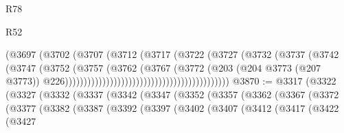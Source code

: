 \begin{lexlean}{R78}
\begin{lexlean}{R52}
\begin{coremodule}
{{{{{{{{{{{{{{{{{{{{{{{{{{{{{{{{{{{{{{{{{{{{{{{{{{{{{{{{{{{{{{{{{{{{{{{{{{{{{{{{{{{{{{{{{{{{{{{{{{{{{{{{{{{{{{{{{{{{{{{{{{{{{{{{{{{{{{{{{{{{{{{{{{{{{{{{{{{{{{{{{{{{{{{{{{{{{{{{{{{{{{{{{{{{{{{{{{{{{{                                                          (@3697
                                                            (@3702
                                                              (@3707
                                                                (@3712
                                                                  (@3717
                                                                    (@3722
                                                                      (@3727
                                                                        (@3732
                                                                          (@3737
                                                                            (@3742
                                                                              (@3747
                                                                                (@3752
                                                                                  (@3757
                                                                                    (@3762
                                                                                      (@3767
                                                                                        (@3772
                                                                                          (@203
                                                                                            (@204
                                                                                              @3773
                                                                                              (@207
                                                                                                @3773))
                                                                                            @226))))))))))))))))))))))))))))))))))))))))))))
@3870 := @3317
    (@3322
      (@3327
        (@3332
          (@3337
            (@3342
              (@3347
                (@3352
                  (@3357
                    (@3362
                      (@3367
                        (@3372
                          (@3377
                            (@3382
                              (@3387
                                (@3392
                                  (@3397
                                    (@3402
                                      (@3407
                                        (@3412
                                          (@3417
                                            (@3422
                                              (@3427
}}}}}}}}}}}}}}}}}}}}}}}}}}}}}}}}}}}}}}}}}}}}}}}}}}}}}}}}}}}}}}}}}}}}}}}}}}}}}}}}}}}}}}}}}}}}}}}}}}}}}}}}}}}}}}}}}}}}}}}}}}}}}}}}}}}}}}}}}}}}}}}}}}}}}}}}}}}}}}}}}}}}}}}}}}}}}}}}}}}}}}}}}}}}}}}}}}}}}}
\end{coremodule}
\end{lexlean}
\end{lexlean}
